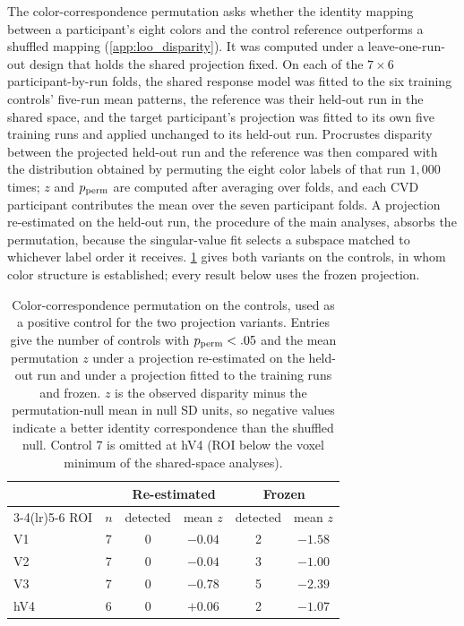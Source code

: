 The color-correspondence permutation asks whether the identity mapping between a participant's eight colors and the control reference outperforms a shuffled mapping (\cref{app:loo_disparity}). It was computed under a leave-one-run-out design that holds the shared projection fixed. On each of the $7 \times 6$ participant-by-run folds, the shared response model was fitted to the six training controls' five-run mean patterns, the reference was their held-out run in the shared space, and the target participant's projection was fitted to its own five training runs and applied unchanged to its held-out run. Procrustes disparity between the projected held-out run and the reference was then compared with the distribution obtained by permuting the eight color labels of that run $1{,}000$ times; $z$ and $p_{\rm perm}$ are computed after averaging over folds, and each CVD participant contributes the mean over the seven participant folds. A projection re-estimated on the held-out run, the procedure of the main analyses, absorbs the permutation, because the singular-value fit selects a subspace matched to whichever label order it receives. \cref{tab:frozen_control} gives both variants on the controls, in whom color structure is established; every result below uses the frozen projection.

\begin{table}[h]
\centering
\caption{Color-correspondence permutation on the controls, used as a positive control for the two projection variants. Entries give the number of controls with $p_{\rm perm} < .05$ and the mean permutation $z$ under a projection re-estimated on the held-out run and under a projection fitted to the training runs and frozen. $z$ is the observed disparity minus the permutation-null mean in null SD units, so negative values indicate a better identity correspondence than the shuffled null. Control 7 is omitted at hV4 (ROI below the voxel minimum of the shared-space analyses).}
\label{tab:frozen_control}
\begin{tabular}{lccccc}
\toprule
 & & \multicolumn{2}{c}{Re-estimated} & \multicolumn{2}{c}{Frozen} \\
\cmidrule(lr){3-4}\cmidrule(lr){5-6}
ROI & $n$ & detected & mean $z$ & detected & mean $z$ \\
\midrule
V1  & 7 & 0 & $-0.04$ & 2 & $-1.58$ \\
V2  & 7 & 0 & $-0.04$ & 3 & $-1.00$ \\
V3  & 7 & 0 & $-0.78$ & 5 & $-2.39$ \\
hV4 & 6 & 0 & $+0.06$ & 2 & $-1.07$ \\
\bottomrule
\end{tabular}
\end{table}

